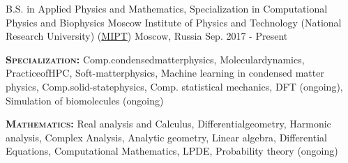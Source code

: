 

\begin{cventries}

  \cventry
    {B.S. in Applied Physics and Mathematics, Specialization in Computational Physics and Biophysics} %
    {Moscow Institute of Physics and Technology (National Research University) (\href{https://mipt.ru/english/}{MIPT})} %
    {Moscow, Russia} %
    {Sep. 2017 - Present} %
    {
      \begin{cvitems} %
        \item {\textsc{\textbf{Specialization:}} Comp.\hspace{2pt}condensed\hspace{2pt}matter\hspace{2pt}physics, \hspace{10pt} Molecular\hspace{2pt}dynamics, \hspace{10pt} Practice\hspace{2pt}of\hspace{2pt}HPC, \hspace{10pt} Soft-matter\hspace{2pt}physics, \hspace{10pt} \newline \textsf{Machine learning in condensed matter physics}, \hspace{10pt} \textsf{Comp.\hspace{2pt}solid-state\hspace{2pt}physics}, \hspace{10pt} \textsf{Comp. statistical mechanics}, \hspace{10pt} \textsf{DFT (ongoing)}, \hspace{10pt} \newline  \textsf{Simulation of biomolecules (ongoing)}}
        \item {\textsc{\textbf{Mathematics:}} Real analysis and Calculus, \hspace{5pt} Differential\hspace{2pt}geometry, \hspace{5pt} Harmonic analysis, \hspace{5pt} Complex Analysis, \hspace{5pt} Analytic geometry, \hspace{5pt} Linear algebra, \hspace{5pt} Differential Equations, \hspace{10pt} \textsf{Computational Mathematics}, \hspace{10pt} \textsf{LPDE}, \hspace{10pt} \textsf{Probability theory (ongoing)}}

\end{cvitems}}
\end{cventries}
